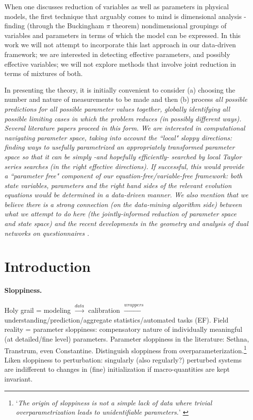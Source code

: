 \documentclass{article}
\begin{document}
When one discusses reduction of variables as well as parameters in physical models, the first technique
that arguably comes to mind is dimensional analysis - finding (through the Buckingham $\pi$ theorem)
nondimensional groupings of variables and parameters in terms of which the model can be expressed.
%
In this work we will not attempt to incorporate this last approach in our data-driven framework; we are
interested in detecting effective parameters, and possibly effective variables; we will not explore
methods that involve joint reduction in terms of mixtures of both. 


In presenting the theory, it is initially convenient to consider (a) choosing the number and nature of
measurements to be made and then (b) process \em{all possible} predictions for \em{all possible} 
parameter values together, globally identifying \em{all possible} limiting cases in which the
problem reduces (in possibly different ways). 
%
Several literature papers proceed in this form.
%
We are interested in computational navigating parameter space, taking into account the ``local"
sloppy directions: finding ways to usefully parametrized an appropriately transformed parameter
space so that it can be simply -and hopefully efficiently- searched by local Taylor series
searches (in the right effective directions). 
%
If successful, this would provide a ``parameter free" component of our equation-free/variable-free
framework: both state variables, parameters and the right hand sides of the relevant evolution equations
would be determined in a data-driven manner.
%
We also mention that we believe there is a strong connection (on the data-mining algorithm side) between
what we attempt to do here (the jointly-informed reduction of parameter space and state space) and the
recent developments in the geometry and analysis of dual networks on questionnaires \cite{A14}.



\section{Introduction}

\paragraph{Sloppiness.}
Holy grail = modeling $\xrightarrow{data}$ calibration
$\xrightarrow{wrappers}$ understanding/prediction/aggregate
statistics/automated tasks (EF).
Field reality = parameter sloppiness:
compensatory nature of individually meaningful
(at detailed/fine level) parameters.
Parameter sloppiness in the literature:
Sethna, Transtrum, even Constantine.
Distinguish sloppiness from overparameterization.\footnote{`{\it The
origin of sloppiness is not a simple lack of data
where trivial overparametrization leads to unidentifiable parameters.}'
\cite{WCGBMBES06}}
Liken sloppiness to perturbation:
singularly (also regularly?) perturbed systems
are indifferent to changes in (fine) initialization
if macro-quantities are kept invariant.
\end{document}
